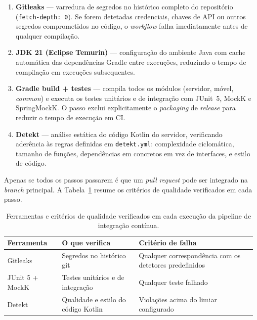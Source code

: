 \begin{enumerate}
	\item \textbf{Gitleaks} --- varredura de segredos no histórico completo do repositório (\texttt{fetch-depth:~0}). Se forem detetadas credenciais, chaves de API ou outros segredos comprometidos no código, o \emph{workflow} falha imediatamente antes de qualquer compilação.
	\item \textbf{JDK 21 (Eclipse Temurin)} --- configuração do ambiente Java com cache automática das dependências Gradle entre execuções, reduzindo o tempo de compilação em execuções subsequentes.
	\item \textbf{Gradle build + testes} --- compila todos os módulos (servidor, móvel, \emph{common}) e executa os testes unitários e de integração com JUnit~5, MockK e SpringMockK. O passo exclui explicitamente o \emph{packaging} de \emph{release} para reduzir o tempo de execução em CI.
	\item \textbf{Detekt} --- análise estática do código Kotlin do servidor, verificando aderência às regras definidas em \texttt{detekt.yml}: complexidade ciclomática, tamanho de funções, dependências em concretos em vez de interfaces, e estilo de código.
\end{enumerate}

Apenas se todos os passos passarem é que um \emph{pull request} pode ser integrado na \emph{branch} principal. A Tabela~\ref{tab:ci-gates} resume os critérios de qualidade verificados em cada passo.

\begin{table}[htbp]
	\centering
	\small
	\begin{tabular}{p{2.8cm} p{5.0cm} p{5.0cm}}
		\toprule
		\textbf{Ferramenta} & \textbf{O que verifica} & \textbf{Critério de falha} \\
		\midrule
		Gitleaks            & Segredos no histórico git                    & Qualquer correspondência com os detetores predefinidos \\
		JUnit 5 + MockK     & Testes unitários e de integração             & Qualquer teste falhado \\
		Detekt              & Qualidade e estilo do código Kotlin          & Violações acima do limiar configurado \\
		\bottomrule
	\end{tabular}
	\caption[Critérios de qualidade verificados na pipeline de CI]{Ferramentas e critérios de qualidade verificados em cada execução da pipeline de integração contínua.}
	\label{tab:ci-gates}
\end{table}

